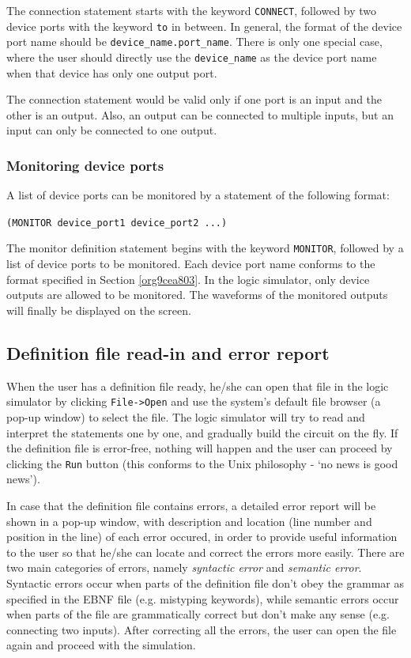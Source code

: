 \documentclass[10pt,a4paper]{article}
\begin{document}
The connection statement starts with the keyword \texttt{CONNECT}, followed
by two device ports with the keyword \texttt{to} in between. In general, the
format of the device port name should be \texttt{device\_name.port\_name}.
There is only one special case, where the user should directly use the
\texttt{device\_name} as the device port name when that device has only one
output port.

The connection statement would be valid only if one port is an input
and the other is an output. Also, an output can be connected to
multiple inputs, but an input can only be connected to one output.

\subsubsection{Monitoring device ports}
\label{sec:org582f835}

A list of device ports can be monitored by a statement of the
following format:

\texttt{(MONITOR device\_port1 device\_port2 ...)}

The monitor definition statement begins with the keyword \texttt{MONITOR},
followed by a list of device ports to be monitored. Each device port
name conforms to the format specified in Section \ref{org9cea803}. In the
logic simulator, only device outputs are allowed to be monitored. The
waveforms of the monitored outputs will finally be displayed on the
screen.

\subsection{Definition file read-in and error report}
\label{sec:org69a8145}

When the user has a definition file ready, he/she can open that file
in the logic simulator by clicking \texttt{File->Open} and use the system's
default file browser (a pop-up window) to select the file. The logic
simulator will try to read and interpret the statements one by one,
and gradually build the circuit on the fly. If the definition file is
error-free, nothing will happen and the user can proceed by clicking
the \texttt{Run} button (this conforms to the Unix philosophy - `no news is
good news'). 

In case that the definition file contains errors, a detailed error
report will be shown in a pop-up window, with description and location
(line number and position in the line) of each error occured, in order
to provide useful information to the user so that he/she can locate
and correct the errors more easily. There are two main categories of
errors, namely \emph{syntactic error} and \emph{semantic error}. Syntactic
errors occur when parts of the definition file don't obey the grammar
as specified in the EBNF file (e.g. mistyping keywords), while
semantic errors occur when parts of the file are grammatically correct
but don't make any sense (e.g. connecting two inputs). After
correcting all the errors, the user can open the file again and
proceed with the simulation.
\end{document}

